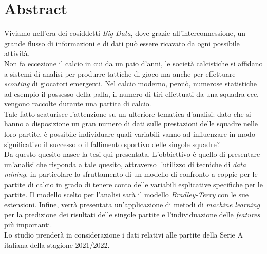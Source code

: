 
\cleardoublepage
{}
{}
\begingroup
\let\clearpage\relax
\let\cleardoublepage\relax
\let\cleardoublepage\relax

\chapter*{Abstract}

Viviamo nell'era dei cosiddetti \emph{Big Data}, dove grazie all'interconnessione, un grande flusso di informazioni e di dati può essere ricavato da ogni possibile attività. \\
Non fa eccezione il calcio in cui da un paio d'anni, le società calcistiche si affidano a sistemi di analisi per produrre tattiche di gioco ma anche per effettuare \textit{scouting} di giocatori emergenti. Nel calcio moderno, perciò, numerose statistiche ad esempio il possesso della palla, il numero di tiri effettuati da una squadra ecc. vengono raccolte durante una partita di calcio.\\
Tale fatto scaturisce l'attenzione su un ulteriore tematica d'analisi: dato che si hanno a disposizione un gran numero di dati sulle prestazioni delle squadre nelle loro partite, è possibile individuare quali variabili vanno ad influenzare in modo significativo il successo o il fallimento sportivo delle singole squadre? \\
Da questo quesito nasce la tesi qui presentata. L’obbiettivo è quello di presentare un'analisi che risponda a tale quesito, attraverso l'utilizzo di tecniche di \textit{data mining}, in particolare lo sfruttamento di un modello di confronto a coppie per le partite di calcio in grado di tenere conto delle variabili esplicative specifiche per le partite. Il modello scelto per l’analisi sarà il modello \emph{Bradley-Terry} con le sue estensioni. Infine, verrà presentata un’applicazione di metodi di \textit{machine learning} per la predizione dei risultati delle singole partite e l'individuazione delle \emph{features} più importanti. \\
Lo studio prenderà in considerazione i dati relativi alle partite della Serie A italiana della stagione 2021/2022.






%
%

\endgroup			

\vfill

